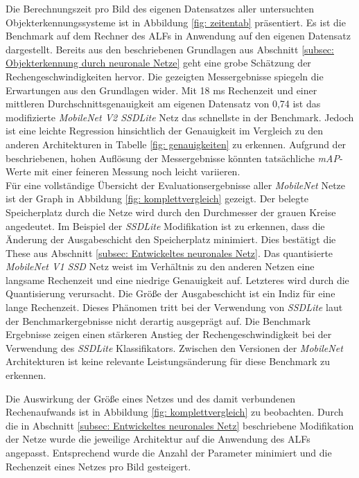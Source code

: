 Die Berechnungszeit pro Bild des eigenen Datensatzes aller untersuchten Objekterkennungssysteme ist in Abbildung \ref{fig: zeitentab} präsentiert. Es ist die Benchmark auf dem Rechner des ALFs in Anwendung auf den eigenen Datensatz dargestellt. Bereits aus den beschriebenen Grundlagen aus Abschnitt \ref{subsec: Objekterkennung durch neuronale Netze} geht eine grobe Schätzung der Rechengeschwindigkeiten hervor. Die gezeigten Messergebnisse spiegeln die Erwartungen aus den Grundlagen wider. Mit 18 ms Rechenzeit und einer mittleren Durchschnittsgenauigkeit am eigenen Datensatz von 0,74 ist das modifizierte \textit{MobileNet V2 SSDLite} Netz das schnellste in der Benchmark. Jedoch ist eine leichte Regression hinsichtlich der Genauigkeit im Vergleich zu den anderen Architekturen in Tabelle \ref{fig: genauigkeiten} zu erkennen. Aufgrund der beschriebenen, hohen Auflösung der Messergebnisse könnten tatsächliche \textit{mAP}-Werte mit einer feineren Messung noch leicht variieren.    \\  

Für eine vollständige Übersicht der Evaluationsergebnisse aller \textit{MobileNet} Netze ist der Graph in Abbildung \ref{fig: komplettvergleich} gezeigt. Der belegte Speicherplatz durch die Netze wird durch den Durchmesser der grauen Kreise angedeutet. Im Beispiel der \textit{SSDLite} Modifikation ist zu erkennen, dass die Änderung der Ausgabeschicht den Speicherplatz minimiert. Dies bestätigt die These aus Abschnitt \ref{subsec: Entwickeltes neuronales Netz}. Das quantisierte \textit{MobileNet V1 SSD} Netz weist im Verhältnis zu den anderen Netzen eine langsame Rechenzeit und eine niedrige Genauigkeit auf. Letzteres wird durch die Quantisierung verursacht. Die Größe der Ausgabeschicht ist ein Indiz für eine lange Rechenzeit. Dieses Phänomen tritt bei der Verwendung von \textit{SSDLite} laut der Benchmarkergebnisse nicht derartig ausgeprägt auf. Die Benchmark Ergebnisse zeigen einen stärkeren Anstieg der Rechengeschwindigkeit bei der Verwendung des \textit{SSDLite} Klassifikators. Zwischen den Versionen der \textit{MobileNet} Architekturen ist keine relevante Leistungsänderung für diese Benchmark zu erkennen. 



Die Auswirkung der Größe eines Netzes und des damit verbundenen Rechenaufwands ist in Abbildung \ref{fig: komplettvergleich} zu beobachten. Durch die in Abschnitt \ref{subsec: Entwickeltes neuronales Netz} beschriebene Modifikation der Netze wurde die jeweilige Architektur auf die Anwendung des ALFs angepasst. Entsprechend wurde die Anzahl der Parameter minimiert und die Rechenzeit eines Netzes pro Bild gesteigert.\\

